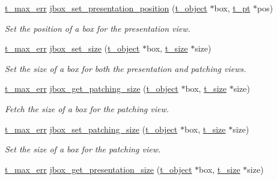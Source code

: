 \begin{DoxyCompactItemize}
\hyperlink{group__datatypes_ga73edaae82b318855cc09fac994918165}{t\_\-max\_\-err} \hyperlink{group__jbox_gad20f69b425b1a22686cfa909d509af60}{jbox\_\-set\_\-presentation\_\-position} (\hyperlink{structt__object}{t\_\-object} $\ast$box, \hyperlink{structt__pt}{t\_\-pt} $\ast$pos)
\begin{DoxyCompactList}\small\item\em Set the position of a box for the presentation view. \item\end{DoxyCompactList}\item 
\hyperlink{group__datatypes_ga73edaae82b318855cc09fac994918165}{t\_\-max\_\-err} \hyperlink{group__jbox_ga09ce5b0e60e447cd40331f63ea8d7e9d}{jbox\_\-set\_\-size} (\hyperlink{structt__object}{t\_\-object} $\ast$box, \hyperlink{structt__size}{t\_\-size} $\ast$size)
\begin{DoxyCompactList}\small\item\em Set the size of a box for both the presentation and patching views. \item\end{DoxyCompactList}\item 
\hyperlink{group__datatypes_ga73edaae82b318855cc09fac994918165}{t\_\-max\_\-err} \hyperlink{group__jbox_ga4b2c0df4da77da3655848defe8f1828e}{jbox\_\-get\_\-patching\_\-size} (\hyperlink{structt__object}{t\_\-object} $\ast$box, \hyperlink{structt__size}{t\_\-size} $\ast$size)
\begin{DoxyCompactList}\small\item\em Fetch the size of a box for the patching view. \item\end{DoxyCompactList}\item 
\hyperlink{group__datatypes_ga73edaae82b318855cc09fac994918165}{t\_\-max\_\-err} \hyperlink{group__jbox_gab7eb5fa0028078fa1665c255ede79cf5}{jbox\_\-set\_\-patching\_\-size} (\hyperlink{structt__object}{t\_\-object} $\ast$box, \hyperlink{structt__size}{t\_\-size} $\ast$size)
\begin{DoxyCompactList}\small\item\em Set the size of a box for the patching view. \item\end{DoxyCompactList}\item 
\hyperlink{group__datatypes_ga73edaae82b318855cc09fac994918165}{t\_\-max\_\-err} \hyperlink{group__jbox_ga4dc98cdc8f15efc5f0980bd4cc07f111}{jbox\_\-get\_\-presentation\_\-size} (\hyperlink{structt__object}{t\_\-object} $\ast$box, \hyperlink{structt__size}{t\_\-size} $\ast$size)

\end{DoxyCompactItemize}
